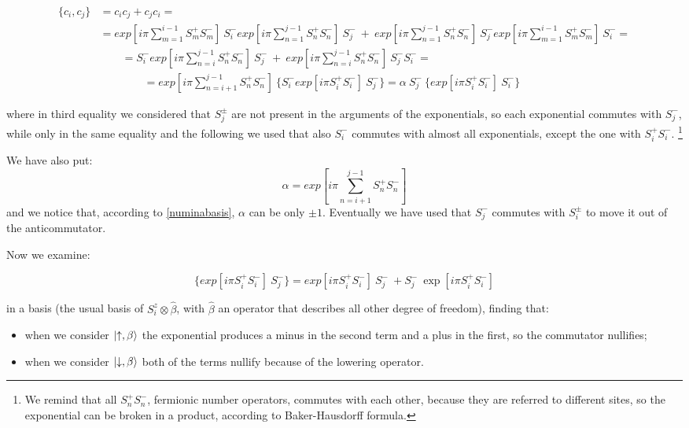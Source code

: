 \documentclass[a4paper,10pt]{article}
\begin{document}
\begin{align*}
\{c_i, c_j\} &= c_i c_j + c_j c_i =\\
&= exp[i\pi \sum_{m=1}^{i-1} S_m^+ S_m^-]~S_i^- exp[i\pi \sum_{n=1}^{j-1} S_n^+ S_n^-]~S_j^- ~+~ exp[i\pi \sum_{n=1}^{j-1} S_n^+ S_n^-]~S_j^- exp[i\pi \sum_{m=1}^{i-1} S_m^+ S_m^-]~S_i^- =\\
& \qquad  = S_i^- exp[i\pi \sum_{n=i}^{j-1} S_n^+ S_n^-]~S_j^- ~+~ exp[i\pi \sum_{n=i}^{j-1} S_n^+ S_n^-]~S_j^- S_i^- =\\
& \qquad \qquad = exp[i\pi \sum_{n=i+1}^{j-1} S_n^+ S_n^-]~ \{S_i^- exp[i\pi S_i^+ S_i^-]~S_j^-\} = \alpha ~S_j^- ~\{exp[i\pi S_i^+ S_i^-]~S_i^-\}
\end{align*}

\noindent where in third equality we considered that $S_j^{\pm}$ are not present in the arguments of the exponentials, so each exponential commutes with $S_j^{-}$, while only in the same equality and the following we used that also $S_i^{-}$ commutes with almost all exponentials, except the one with $ S_i^+ S_i^-$.
\footnote{We remind that all $ S_n^+ S_n^-$, fermionic number operators, commutes with each other, because they are referred to different sites, so the exponential can be broken in a product, according to Baker-Hausdorff formula.}

We have also put: 
\begin{equation*}
\alpha = exp[i\pi \sum_{n=i+1}^{j-1} S_n^+ S_n^-]
\end{equation*}
\noindent and we notice that, according to \cref{numinabasis}, $\alpha$ can be only $\pm 1$. Eventually we have used that $S_j^-$ commutes with $S_i^{\pm}$ to move it out of the anticommutator.

Now we examine:

\begin{equation*}
\{exp[i\pi S_i^+ S_i^-]~S_j^-\} = exp[i\pi S_i^+ S_i^-]~S_j^-\ + S_j^-~\exp[i\pi S_i^+ S_i^-]
\end{equation*}

\noindent in a basis (the usual basis of $S_i^z \otimes \hat{\beta}$, with $\hat{\beta}$ an operator that describes all other degree of freedom), finding that:
\begin{itemize}
	\item when we consider $\ket{\uparrow, \beta}$ the exponential produces a minus in the second term and a plus in the first, so the commutator nullifies;
	\item when we consider $\ket{\downarrow, \beta}$ both of the terms nullify because of the lowering operator.
\end{itemize}
\end{document}
